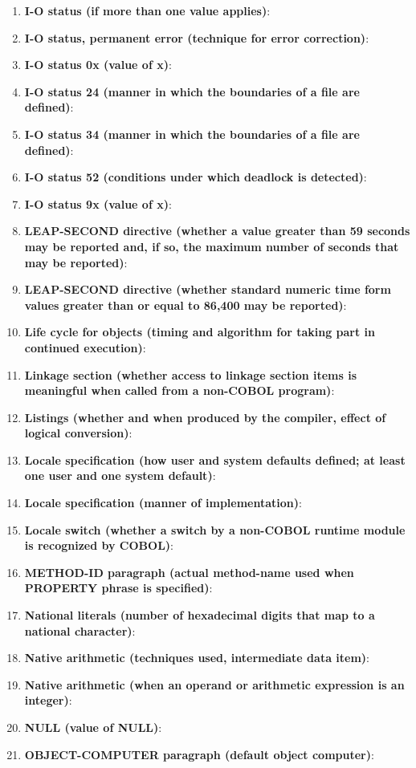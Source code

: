 \begin{enumerate}
\item \textbf{I-O status (if more than one value applies)}:
\item \textbf{I-O status, permanent error (technique for error correction)}:
\item \textbf{I-O status 0x (value of x)}:
\item \textbf{I-O status 24 (manner in which the boundaries of a file are defined)}:
\item \textbf{I-O status 34 (manner in which the boundaries of a file are defined)}:
\item \textbf{I-O status 52 (conditions under which deadlock is detected)}:
\item \textbf{I-O status 9x (value of x)}:
\item \textbf{LEAP-SECOND directive (whether a value greater than 59 seconds may be reported and, if so, the maximum number of seconds that may be reported)}:
\item \textbf{LEAP-SECOND directive (whether standard numeric time form values greater than or equal to 86,400 may be reported)}:
\item \textbf{Life cycle for objects (timing and algorithm for taking part in continued execution)}:
\item \textbf{Linkage section (whether access to linkage section items is meaningful when called from a non-COBOL program)}:
\item \textbf{Listings (whether and when produced by the compiler, effect of logical conversion)}:
\item \textbf{Locale specification (how user and system defaults defined; at least one user and one system default)}:
\item \textbf{Locale specification (manner of implementation)}:
\item \textbf{Locale switch (whether a switch by a non-COBOL runtime module is recognized by COBOL)}:
\item \textbf{METHOD-ID paragraph (actual method-name used when PROPERTY phrase is specified)}:
\item \textbf{National literals (number of hexadecimal digits that map to a national character)}:
\item \textbf{Native arithmetic (techniques used, intermediate data item)}:
\item \textbf{Native arithmetic (when an operand or arithmetic expression is an integer)}:
\item \textbf{NULL (value of NULL)}:
\item \textbf{OBJECT-COMPUTER paragraph (default object computer)}:

\end{enumerate}
